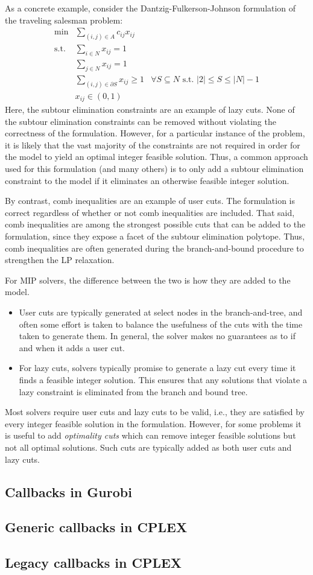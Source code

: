 \documentclass[12pt]{article}
\begin{document}
As a concrete example, consider the Dantzig-Fulkerson-Johnson formulation of the traveling salesman problem:
\begin{align*}
    \min & \sum_{(i,j) \in A} c_{ij} x_{ij} \\
    \mbox{s.t.} & \sum_{i \in N} x_{ij} = 1 \\
    & \sum_{j \in N} x_{ij} = 1 \\
    & \sum_{(i,j) \in \partial S} x_{ij} \ge 1 & \forall S \subseteq N \mbox{ s.t. } |2| \le S \le |N| - 1 \\
    & x_{ij} \in (0,1)
\end{align*}
Here, the subtour elimination constraints are an example of lazy cuts. None of the subtour elimination constraints can be removed without violating the correctness of the formulation. However, for a particular instance of the problem, it is likely that the vast majority of the constraints are not required in order for the model to yield an optimal integer feasible solution. Thus, a common approach used for this formulation (and many others) is to only add a subtour elimination constraint to the model if it eliminates an otherwise feasible integer solution.

By contrast, comb inequalities are an example of user cuts. The formulation is correct regardless of whether or not comb inequalities are included. That said, comb inequalities are among the strongest possible cuts that can be added to the formulation, since they expose a facet of the subtour elimination polytope. Thus, comb inequalities are often generated during the branch-and-bound procedure to strengthen the LP relaxation.

For MIP solvers, the difference between the two is how they are added to the model.
\begin{itemize}
    \item User cuts are typically generated at select nodes in the branch-and-tree, and often some effort is taken to balance the usefulness of the cuts with the time taken to generate them. In general, the solver makes no guarantees as to if and when it adds a user cut.
    \item For lazy cuts, solvers typically promise to generate a lazy cut every time it finds a feasible integer solution. This ensures that any solutions that violate a lazy constraint is eliminated from the branch and bound tree.
\end{itemize}


Most solvers require user cuts and lazy cuts to be valid, i.e., they are satisfied by every integer feasible solution in the formulation. However, for some problems it is useful to add \emph{optimality cuts} which can remove integer feasible solutions but not all optimal solutions. Such cuts are typically added as both user cuts and lazy cuts.

\subsection{Callbacks in Gurobi}

\subsection{Generic callbacks in CPLEX}

\subsection{Legacy callbacks in CPLEX}
\end{document}
